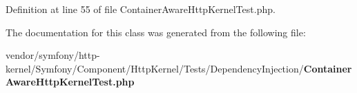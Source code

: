 Definition at line 55 of file Container\+Aware\+Http\+Kernel\+Test.\+php.



The documentation for this class was generated from the following file\+:\begin{DoxyCompactItemize}
\item 
vendor/symfony/http-\/kernel/\+Symfony/\+Component/\+Http\+Kernel/\+Tests/\+Dependency\+Injection/{\bf Container\+Aware\+Http\+Kernel\+Test.\+php}\end{DoxyCompactItemize}
